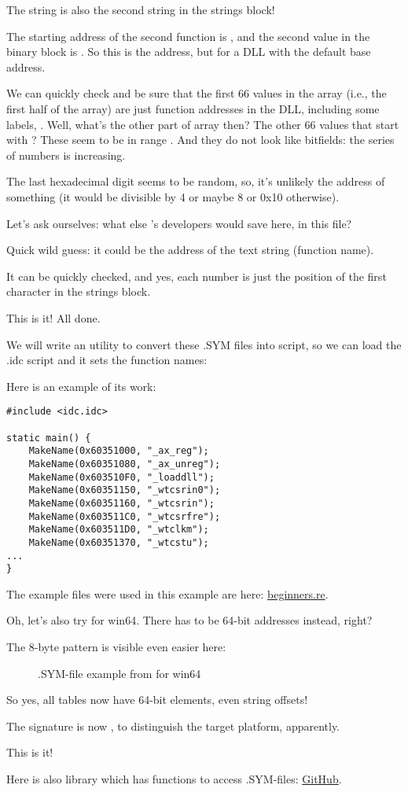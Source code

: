 The  string is also the second string in the strings block!

The starting address of the second function is , and the second value in the binary 
block is .
So this is the address, 
but for a DLL with the default base address.

We can quickly check and be sure that the first 66 values in the array (i.e., the first half of the array) 
are just function addresses in the DLL, including some labels, \etc{}.
Well, what's the other part of array then? 
The other 66 values that start with ? 
These seem to be in range \TT{[0...0x3F8]}. 
And they do not look like bitfields: 
the series of numbers is increasing.

The last hexadecimal digit seems to be random, so, it's unlikely the address of something 
(it would be divisible by 4 or maybe 8 or 0x10 otherwise).

Let's ask ourselves: what else \oracle's developers would save here, in this file?

Quick wild guess: it could be the address of the text string (function name).

It can be quickly checked, and yes, each number is just the position of the first character in the strings block.

This is it! All done.

We will write an utility to convert these .SYM files into \IDA script, 
so we can load the .idc script and it sets the function names:



Here is an example of its work:

\begin{lstlisting}
#include <idc.idc>

static main() {
	MakeName(0x60351000, "_ax_reg");
	MakeName(0x60351080, "_ax_unreg");
	MakeName(0x603510F0, "_loaddll");
	MakeName(0x60351150, "_wtcsrin0");
	MakeName(0x60351160, "_wtcsrin");
	MakeName(0x603511C0, "_wtcsrfre");
	MakeName(0x603511D0, "_wtclkm");
	MakeName(0x60351370, "_wtcstu");
...
}
\end{lstlisting}

The example files were used in this example are here: 
\href{http://go.yurichev.com/17216}{beginners.re}.

\clearpage
Oh, let's also try \oracle for win64.
There has to be 64-bit addresses instead, right?

The 8-byte pattern is visible even easier here:

\begin{figure}[H]
\centering
{}
\caption{.SYM-file example from \oracle for win64}
\label{fig:oracle_SYM_whole64}
\end{figure}

So yes, all tables now have 64-bit elements, even string offsets!

The signature is now , to distinguish the target platform, apparently.

This is it!

Here is also library which has functions to access \oracle .SYM-files:
\href{http://go.yurichev.com/17007}{GitHub}.
